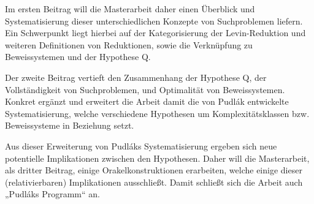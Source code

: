 \documentclass[nofonts]{uebung}
\begin{document}
Im ersten Beitrag will die Masterarbeit daher einen Überblick und Systematisierung dieser unterschiedlichen Konzepte von Suchproblemen liefern. Ein Schwerpunkt liegt hierbei auf der Kategorisierung der Levin-Reduktion und weiteren Definitionen von Reduktionen, sowie die Verknüpfung zu Beweissystemen und der Hypothese Q.

Der zweite Beitrag vertieft den Zusammenhang der Hypothese Q, der Vollständigkeit von Suchproblemen, und Optimalität von Beweissystemen. Konkret ergänzt und erweitert die Arbeit damit die von Pudlák entwickelte Systematisierung, welche verschiedene Hypothesen um Komplexitätsklassen bzw. Beweissysteme in Beziehung setzt.

Aus dieser Erweiterung von Pudláks Systematisierung ergeben sich neue potentielle Implikationen zwischen den Hypothesen. Daher will die Masterarbeit, als dritter Beitrag, einige Orakelkonstruktionen erarbeiten, welche einige dieser (relativierbaren) Implikationen ausschließt. Damit schließt sich die Arbeit auch „Pudláks Programm“ an.
\end{document}
